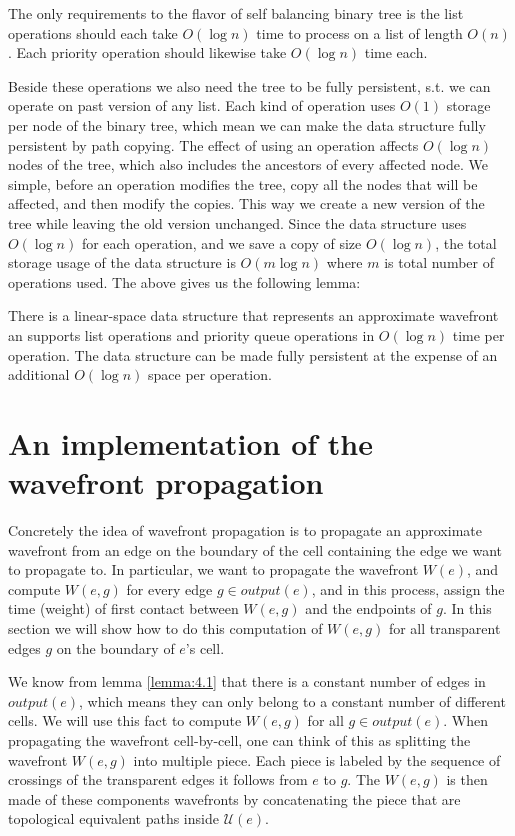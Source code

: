 The only requirements to the flavor of self balancing binary tree is the list operations should each 
take $O(\log n)$ time to process on a list of length $O(n)$. Each priority operation should likewise 
take $O(\log n)$ time each. 

Beside these operations we also need the tree to be fully persistent, s.t. we can operate on past 
version of any list. Each kind of operation uses $O(1)$ storage per node of the binary tree, which 
mean we can make the data structure fully persistent by path copying. The effect of using an operation 
affects $O(\log n)$ nodes of the tree, which also includes the ancestors of every affected node. We 
simple, before an operation modifies the tree, copy all the nodes that will be affected, and then
modify the copies. This way we create a new version of the tree while leaving the old version unchanged.
Since the data structure uses $O(\log n)$ for each operation, and we save a copy of size $O(\log n)$, 
the total storage usage of the data structure is $O(m \log n)$ where $m$ is total number of operations 
used. The above gives us the following lemma:

\begin{Lemma} 
There is a linear-space data structure that represents an approximate wavefront an supports list 
operations and priority queue operations in $O(\log n)$ time per operation. The data structure can be 
made fully persistent at the expense of an additional $O(\log n)$ space per operation.
\end{Lemma}

\section{An implementation of the wavefront propagation} \label{section:implwavefront}

Concretely the idea of wavefront propagation is to propagate an approximate wavefront from an edge on 
the boundary of the cell containing the edge we want to propagate to. In particular, we want to propagate 
the wavefront $W(e)$, and compute $W(e,g)$ for every edge $g \in output(e)$, and in this process, assign the 
time (weight) of first contact between $W(e,g)$ and the endpoints of $g$. In this section we will show how 
to do this computation of $W(e,g)$ for all transparent edges $g$ on the boundary of $e$'s cell. 

We know from lemma \ref{lemma:4.1} that there is a constant number of edges in $output(e)$, which means 
they can only belong to a constant number of different cells. We will use this fact to compute $W(e,g)$ 
for all $g \in output(e)$. When propagating the wavefront cell-by-cell, one can think of this as splitting 
the wavefront $W(e,g)$ into multiple piece. Each piece is labeled by the sequence of crossings of the
transparent edges it follows from $e$ to $g$. The $W(e,g)$ is then made of these components wavefronts by 
concatenating the piece that are topological equivalent paths inside $\mathcal{U}(e)$. 

